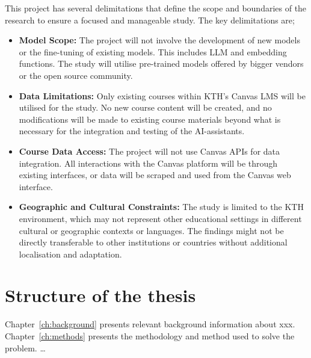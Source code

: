 This project has several delimitations that define the scope and boundaries of the research to ensure a focused and manageable study. The key delimitations are;


\begin{itemize}
        \item \textbf{Model Scope:} The project will not involve the development of new models or the fine-tuning of existing models. This includes \gls{LLM} and embedding functions. The study will utilise pre-trained models offered by bigger vendors or the open source community.
        \item \textbf{Data Limitations:} Only existing courses within KTH's Canvas \gls{LMS} will be utilised for the study. No new course content will be created, and no modifications will be made to existing course materials beyond what is necessary for the integration and testing of the AI-assistants.
        \item \textbf{Course Data Access:} The project will not use Canvas APIs for data integration. All interactions with the Canvas platform will be through existing interfaces, or data will be scraped and used from the Canvas web interface.
        \item \textbf{Geographic and Cultural Constraints:} The study is limited to the KTH environment, which may not represent other educational settings in different cultural or geographic contexts or languages. The findings might not be directly transferable to other institutions or countries without additional localisation and adaptation.
\end{itemize}


\section{Structure of the thesis}




Chapter~\ref{ch:background} presents relevant background information about xxx.  Chapter~\ref{ch:methods} presents the methodology and method used to solve the problem. …


\cleardoublepage